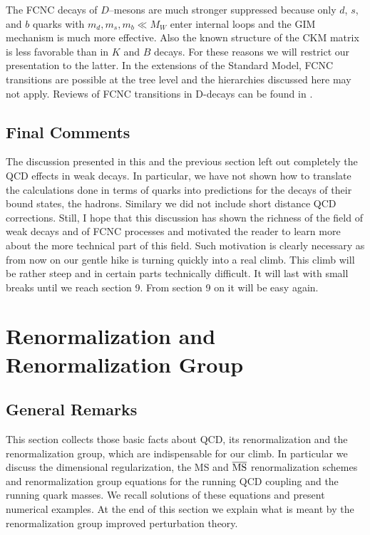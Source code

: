 \documentclass[12pt]{article}
\begin{document}
\begin{itemize}
The FCNC decays of $D$--mesons are much stronger suppressed because only
$d$, $s$, and $b$ quarks with $m_d,m_s,m_b\ll M_W$ enter internal loops
and the GIM mechanism is much more effective. Also the known structure
of the CKM matrix is less favorable than in $K$ and $B$ decays. For these
reasons we will restrict our presentation to the latter.
In the extensions of the Standard Model, FCNC transitions are possible
at the tree level and the hierarchies discussed here may not apply.
Reviews of FCNC transitions in D-decays can be found in \cite{DDD}.
\subsection{Final Comments}
The discussion presented in this and the previous section left out completely 
the QCD effects in weak decays.
In particular, we have not shown how
to translate the calculations done in terms of quarks into predictions
for the decays of their bound states, the hadrons. Similary
we did not include short distance QCD corrections. 
Still, I hope that this discussion has shown the richness of the field
of weak decays and of FCNC processes and motivated the reader to
learn more about the more technical part of this field. Such
motivation is clearly necessary as from now on our gentle hike
is turning quickly into a real climb. This climb will be rather
steep and in certain parts technically difficult. It will last
with small breaks until we reach section 9. From section 9 on it will
be easy again. 
\section{Renormalization and Renormalization Group}
\setcounter{equation}{0}
\subsection{General Remarks}
This section collects  those basic facts about QCD, its renormalization
and the renormalization group,
which are indispensable for our climb. In particular we discuss
the dimensional regularization, the MS and ${\rm\overline{MS}}$
renormalization schemes and renormalization group equations
for the running QCD coupling and the running quark masses.
We recall solutions of these equations and present numerical
examples. At the end of this section we explain what is meant
by the renormalization group improved perturbation theory.

\end{itemize}
\end{document}
